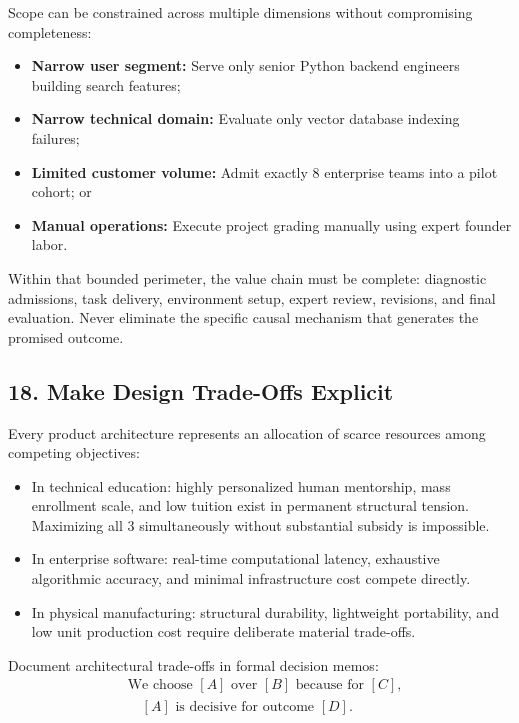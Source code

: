 Scope can be constrained across multiple dimensions without compromising completeness:
\begin{itemize}
    \item \textbf{Narrow user segment:} Serve only senior Python backend engineers building search features;
    \item \textbf{Narrow technical domain:} Evaluate only vector database indexing failures;
    \item \textbf{Limited customer volume:} Admit exactly 8 enterprise teams into a pilot cohort; or
    \item \textbf{Manual operations:} Execute project grading manually using expert founder labor.
\end{itemize}

Within that bounded perimeter, the value chain must be complete: diagnostic admissions, task delivery, environment setup, expert review, revisions, and final evaluation. Never eliminate the specific causal mechanism that generates the promised outcome.

\subsection*{18. Make Design Trade-Offs Explicit}

Every product architecture represents an allocation of scarce resources among competing objectives:
\begin{itemize}
    \item In technical education: highly personalized human mentorship, mass enrollment scale, and low tuition exist in permanent structural tension. Maximizing all 3 simultaneously without substantial subsidy is impossible.
    \item In enterprise software: real-time computational latency, exhaustive algorithmic accuracy, and minimal infrastructure cost compete directly.
    \item In physical manufacturing: structural durability, lightweight portability, and low unit production cost require deliberate material trade-offs.
\end{itemize}

Document architectural trade-offs in formal decision memos:
\begin{equation}
\begin{aligned}
&\text{We choose } [A] \text{ over } [B] \text{ because for } [C], \\
&\quad [A] \text{ is decisive for outcome } [D].
\end{aligned}
\end{equation}

